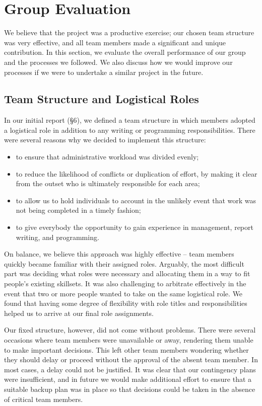 \newpage
\section{Group Evaluation}

We believe that the project was a productive exercise; our chosen team structure was very effective, and all team members made a significant and unique contribution. In this section, we evaluate the overall performance of our group and the processes we followed. We also discuss how we would improve our processes if we were to undertake a similar project in the future.

\subsection{Team Structure and Logistical Roles}
In our initial report (§6), we defined a team structure in which members adopted a logistical role in addition to any writing or programming responsibilities. There were several reasons why we decided to implement this structure:
\begin{itemize}[noitemsep]
	\item to ensure that administrative workload was divided evenly;
	\item to reduce the likelihood of conflicts or duplication of effort, by making it clear from the outset who is ultimately responsible for each area;
	\item to allow us to hold individuals to account in the unlikely event that work was not being completed in a timely fashion;
	\item to give everybody the opportunity to gain experience in management, report writing, and programming.
\end{itemize}

On balance, we believe this approach was highly effective -- team members quickly became familiar with their assigned roles. Arguably, the most difficult part was deciding what roles were necessary and allocating them in a way to fit people’s existing skillsets. It was also challenging to arbitrate effectively in the event that two or more people wanted to take on the same logistical role. We found that having some degree of flexibility with role titles and responsibilities helped us to arrive at our final role assignments.

Our fixed structure, however, did not come without problems. There were several occasions where team members were unavailable or away, rendering them unable to make important decisions. This left other team members wondering whether they should delay or proceed without the approval of the absent team member. In most cases, a delay could not be justified. It was clear that our contingency plans were insufficient, and in future we would make additional effort to ensure that a suitable backup plan was in place so that decisions could be taken in the absence of critical team members.

